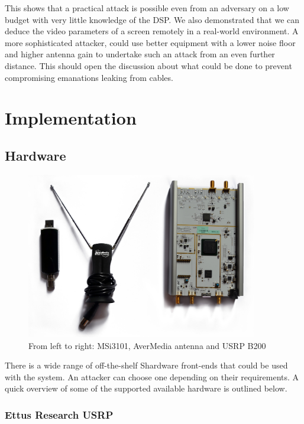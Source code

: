 \documentclass[a4paper,12pt,twoside,openright]{report}
\begin{document}
This shows that a practical attack is possible even from an adversary on a low budget with very little knowledge of the DSP. We also demonstrated that we can deduce the video parameters of a screen remotely in a real-world environment. A more sophisticated attacker, could use better equipment with a lower noise floor and higher antenna gain to undertake such an attack from an even further distance. This should open the discussion about what could be done to prevent compromising emanations leaking from cables.

\chapter{Implementation} 

\section{Hardware}
\label{sec:hw} 

\begin{figure}[h!]
 
  \centering
    \includegraphics[width=0.9\textwidth]{equipment}
    \caption{From left to right: MSi3101, AverMedia antenna and USRP B200}
\end{figure}

There is a wide range of off-the-shelf Shardware front-ends that could be used with the system. An attacker can choose one depending on their requirements. A quick overview of some of the supported available hardware is outlined below.

\subsection{Ettus Research USRP}
\end{document}
